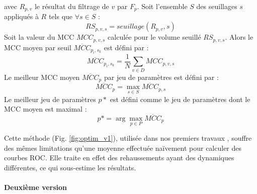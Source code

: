   avec $R_{p,v}$ le résultat du filtrage de $v$ par $F_p$.
  Soit l'ensemble $S$ des seuillages $s$ appliqués à $R$ tels que $\forall s \in S$ :
  \begin{equation}
    RS_{p,v,s} = seuillage(R_{p,v},s) 
  \end{equation}
  Soit la valeur du MCC $MCC_{p,v,s}$ calculée pour le volume seuillé $RS_{p,v,s}$.
  Alors le MCC moyen par seuil $\overline{MCC}_{p_i,s_k}$ est défini par :
  \begin{equation}
    \overline{MCC}_{p_i,s_k} = \frac{1}{N}\sum_{v \in D} MCC_{p,v,s}
  \end{equation}
  Le meilleur MCC moyen $\overline{MCC}_{p}$ par jeu de paramètres est défini par : 
  \begin{equation}
    \overline{MCC}_{p} = \max_{s \in S} \overline{MCC}_{p,s}
  \end{equation}
  Le meilleur jeu de paramètres $p*$ est défini comme le jeu de paramètres dont le MCC moyen est maximal :
  \begin{equation}
    p* = \arg\max_{p \in P} \overline{MCC}_{p}
  \end{equation}

  Cette méthode (Fig. \ref{fig:optim_v1}), utilisée dans nos premiers travaux \cite{Lamy2020_VPH_bench} \cite{Lamy2021_RRPR} \cite{Lamy2020_ICPR} \cite{Lamy2021_ORASIS}, souffre des mêmes limitations qu'une moyenne effectuée naïvement pour calculer des courbes ROC. Elle traite en effet des rehaussements ayant des dynamiques différentes, ce qui sous-estime les résultats. 
  
  \paragraph{Deuxième version}

